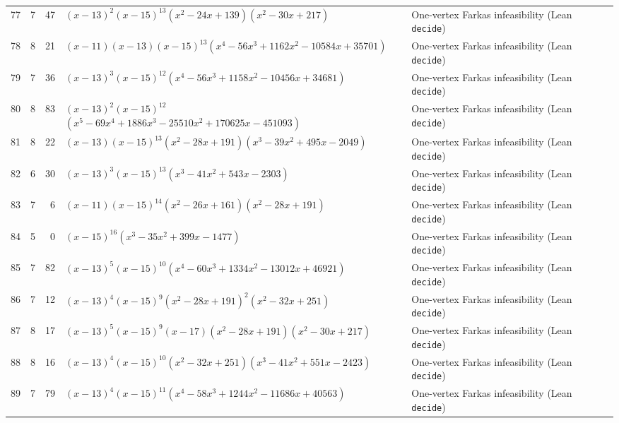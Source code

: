 \documentclass[11pt,reqno]{amsart}
\theoremstyle{definition}
\theoremstyle{remark}
\numberwithin{equation}{section}
\numberwithin{table}{section}
\begin{document}
{\begin{longtable}{@{}rrr>{\raggedright\arraybackslash}p{2.50in}>{\raggedright\arraybackslash}p{2.30in}@{}}
77 & 7 & 47 & $(x-13)^2$\allowbreak $(x-15)^{13}$\allowbreak $(x^2-24x+139)$\allowbreak $(x^2-30x+217)$ & One-vertex Farkas infeasibility (Lean \texttt{decide}) \\
78 & 8 & 21 & $(x-11)$\allowbreak $(x-13)$\allowbreak $(x-15)^{13}$\allowbreak $(x^4-56x^3+1162x^2-10584x+35701)$ & One-vertex Farkas infeasibility (Lean \texttt{decide}) \\
79 & 7 & 36 & $(x-13)^3$\allowbreak $(x-15)^{12}$\allowbreak $(x^4-56x^3+1158x^2-10456x+34681)$ & One-vertex Farkas infeasibility (Lean \texttt{decide}) \\
80 & 8 & 83 & $(x-13)^2$\allowbreak $(x-15)^{12}$\allowbreak $(x^5-69x^4+1886x^3-25510x^2+170625x-451093)$ & One-vertex Farkas infeasibility (Lean \texttt{decide}) \\
81 & 8 & 22 & $(x-13)$\allowbreak $(x-15)^{13}$\allowbreak $(x^2-28x+191)$\allowbreak $(x^3-39x^2+495x-2049)$ & One-vertex Farkas infeasibility (Lean \texttt{decide}) \\
82 & 6 & 30 & $(x-13)^3$\allowbreak $(x-15)^{13}$\allowbreak $(x^3-41x^2+543x-2303)$ & One-vertex Farkas infeasibility (Lean \texttt{decide}) \\
83 & 7 & 6 & $(x-11)$\allowbreak $(x-15)^{14}$\allowbreak $(x^2-26x+161)$\allowbreak $(x^2-28x+191)$ & One-vertex Farkas infeasibility (Lean \texttt{decide}) \\
84 & 5 & 0 & $(x-15)^{16}$\allowbreak $(x^3-35x^2+399x-1477)$ & One-vertex Farkas infeasibility (Lean \texttt{decide}) \\
85 & 7 & 82 & $(x-13)^5$\allowbreak $(x-15)^{10}$\allowbreak $(x^4-60x^3+1334x^2-13012x+46921)$ & One-vertex Farkas infeasibility (Lean \texttt{decide}) \\
86 & 7 & 12 & $(x-13)^4$\allowbreak $(x-15)^9$\allowbreak $(x^2-28x+191)^2$\allowbreak $(x^2-32x+251)$ & One-vertex Farkas infeasibility (Lean \texttt{decide}) \\
87 & 8 & 17 & $(x-13)^5$\allowbreak $(x-15)^9$\allowbreak $(x-17)$\allowbreak $(x^2-28x+191)$\allowbreak $(x^2-30x+217)$ & One-vertex Farkas infeasibility (Lean \texttt{decide}) \\
88 & 8 & 16 & $(x-13)^4$\allowbreak $(x-15)^{10}$\allowbreak $(x^2-32x+251)$\allowbreak $(x^3-41x^2+551x-2423)$ & One-vertex Farkas infeasibility (Lean \texttt{decide}) \\
89 & 7 & 79 & $(x-13)^4$\allowbreak $(x-15)^{11}$\allowbreak $(x^4-58x^3+1244x^2-11686x+40563)$ & One-vertex Farkas infeasibility (Lean \texttt{decide}) \\

\end{longtable}}
\end{document}
